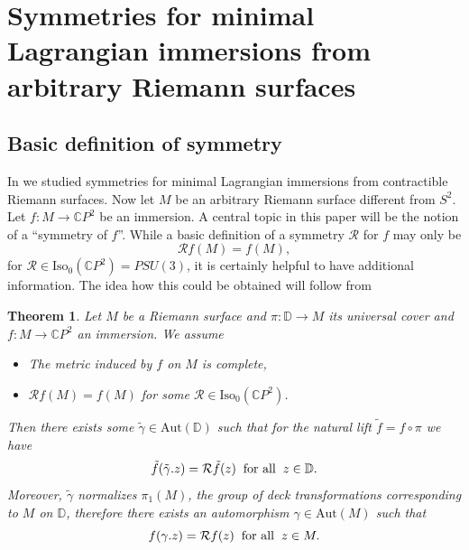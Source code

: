 \documentclass[a4paper,11pt]{amsart}
\newtheorem{theorem}{Theorem}[section]
\theoremstyle{definition}
\numberwithin{equation}{section}
\newcommand{\C}{\mathbb{C}}
\newcommand{\D}{\mathbb{D}}
\begin{document}
\section{Symmetries for minimal Lagrangian immersions from arbitrary Riemann surfaces}
\label{sec:4}

\subsection{Basic definition of symmetry}
In \cite{DoMaB1} we studied symmetries for minimal Lagrangian immersions from contractible Riemann surfaces. Now
let $M$ be an arbitrary Riemann surface different from $S^2$.
Let $f: M \rightarrow \C P^2$ be an immersion.
A central topic in this paper will be the notion of a ``symmetry of $f$''.
While a basic definition of a symmetry $\mathcal{R}$ for $f$ may  only be 
$$\mathcal{R} f(M) = f(M),$$ 
 for $\mathcal{R}\in \mathrm{Iso}_0(\mathbb{C}P^2)=PSU(3)$, it is certainly  helpful to have additional information. The idea how this could be
obtained will follow from

\begin{theorem}\label{thm:symmetry}
Let $M$ be a   Riemann surface and $\pi: \D\rightarrow M$ its universal cover
and  $f:M \rightarrow \C P^2$  an immersion. We assume
\begin{itemize}
\item[a)] The metric induced by $f$ on $M$ is complete,
\item[b)] $\mathcal{R} f(M) = f(M)$ for some  $\mathcal{R} \in  \mathrm{Iso}_0(\C P^2)$.
\end{itemize}
Then there exists some $\tilde{\gamma}  \in \mathrm{Aut}(\D)$ such that for the natural lift
$\tilde{f} = f \circ \pi$ we have
\begin{equation}
\tilde{f}(\tilde{\gamma}. z) = \mathcal{R} \tilde{f}(z) \hspace{2mm} \mbox{for all} \hspace{2mm} z \in \D.
\end{equation}
Moreover, 
$\tilde{\gamma}$ normalizes $\pi_1(M)$, the group  of deck transformations corresponding to $M$ on $\D$,
 therefore there exists an  automorphism $\gamma \in \mathrm{Aut}(M)$ such that
\begin{equation}
f(\gamma.z) = \mathcal{R} f(z)  \hspace{2mm} \mbox{for all} \hspace{2mm} z \in M.
\end{equation}
\end{theorem}
\end{document}
